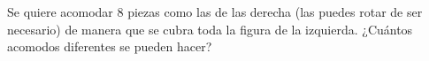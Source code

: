 Se quiere acomodar $8$ piezas como las de las derecha (las puedes rotar de ser necesario) de manera que se cubra toda la figura de la izquierda. ¿Cuántos acomodos diferentes se pueden hacer?